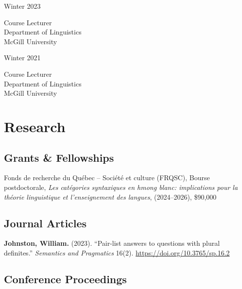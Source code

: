 \documentclass[11pt,oneside,DIV=calc,parskip=off]{scrarticle} %
\newlength{\leftcolwidth}
\newlength{\rightcolwidth}
\newlength{\spacingbefore}
\newlength{\spacingafter}
\newcommand{\myonecol}[1]{%
	\vspace{\spacingbefore}%
	\begin{minipage}[t]{\linewidth}%
		\strut#1%
	\end{minipage}%
	\vspace{\spacingafter}\par%
	}
\newcommand{\mytwocol}[2]{%
	\vspace{\spacingbefore}%
	\begin{minipage}[t]{\leftcolwidth}%
		\strut#1%
	\end{minipage}%
	\begin{minipage}[t]{\rightcolwidth}%
		\strut#2%
	\end{minipage}%
	\vspace{\spacingafter}\par%
	}
\newcommand{\pub}[1]{%
	\myonecol{#1}%
	}
\newcommand{\cvline}[2]{%
	\mytwocol{#1}{#2}%
	}
\begin{document}

\cvline{Winter 2023}{Course Lecturer\\Department of Linguistics\\McGill University}

\cvline{Winter 2021}{Course Lecturer\\Department of Linguistics\\McGill University}


\section{Research}

\subsection{Grants \& Fellowships}%

\pub{Fonds de recherche du Québec -- Société et culture (FRQSC), Bourse postdoctorale, \textit{Les catégories syntaxiques en hmong blanc: implications pour la théorie linguistique et l'enseignement des langues}, %
(2024--2026), \$90,000}

\subsection{Journal Articles}

\pub{\textbf{Johnston, William.} (2023). ``Pair-list answers to questions with plural definites.'' \textit{Semantics and Pragmatics} 16(2). \href{https://doi.org/10.3765/sp.16.2}{https://doi.org/10.3765/sp.16.2}}


\subsection{Conference Proceedings}
\end{document}
